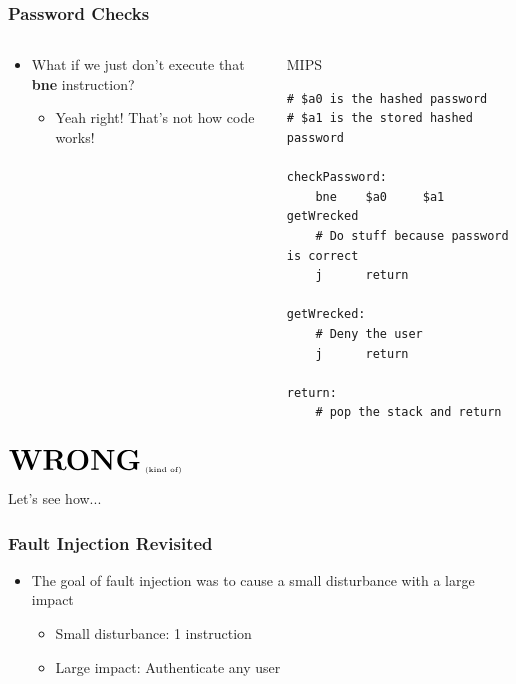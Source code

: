 \documentclass{beamer}
\begin{document}
\begin{frame}[fragile]
\frametitle{Password Checks}{\vspace{-3em}}
\begin{columns}[t]
\begin{column}{0.5\textwidth}
\begin{itemize}
    \item What if we just don't execute that \textbf{bne} instruction?
        \begin{itemize}
            \item Yeah right! That's not how code works!
        \end{itemize}
\end{itemize}
\end{column}

\begin{column}{0.5\textwidth}
\begin{center}MIPS\end{center}
\begin{lstlisting}[language={}]
# $a0 is the hashed password
# $a1 is the stored hashed password

checkPassword:
    bne    $a0     $a1    getWrecked
    # Do stuff because password is correct
    j      return

getWrecked:
    # Deny the user
    j      return

return:
    # pop the stack and return
\end{lstlisting}
\end{column}

\end{columns}
\end{frame}

\begin{frame}
    \begin{center}$\textbf{\huge{WRONG}}_\text{ \tiny{(kind of)}}$\end{center}
    \begin{center}Let's see how...\end{center}
\end{frame}

\begin{frame}[t]
\frametitle{Fault Injection Revisited}
\begin{itemize}
\item The goal of fault injection was to cause a small disturbance with a large impact
    \begin{itemize}
    \item Small disturbance: 1 instruction
    \item Large impact: Authenticate any user
    \end{itemize}
\end{itemize}
\end{frame}
\end{document}
